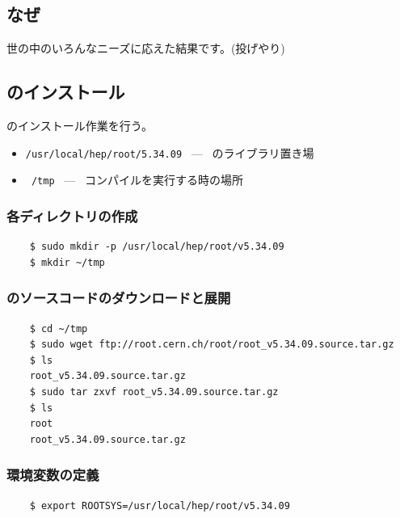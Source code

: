 \documentclass{jarticle}
\begin{document}
  \subsection{なぜ\ROOT }
  世の中のいろんなニーズに応えた結果です。(投げやり)


  \subsection{\ROOT のインストール}
  \ROOT のインストール作業を行う。
  \begin{itemize}
   \item \texttt{/usr/local/hep/root/5.34.09} \ --- \ \ROOT のライブラリ置き場
   \item \texttt{~/tmp} \ --- \ コンパイルを実行する時の場所
  \end{itemize}


   \subsubsection*{各ディレクトリの作成}
\begin{verbatim}
	$ sudo mkdir -p /usr/local/hep/root/v5.34.09
	$ mkdir ~/tmp
\end{verbatim}


   \subsubsection*{\ROOT のソースコードのダウンロードと展開}
\begin{verbatim}
	$ cd ~/tmp
	$ sudo wget ftp://root.cern.ch/root/root_v5.34.09.source.tar.gz
	$ ls
	root_v5.34.09.source.tar.gz
	$ sudo tar zxvf root_v5.34.09.source.tar.gz
	$ ls
	root
	root_v5.34.09.source.tar.gz
\end{verbatim}


   \subsubsection*{環境変数の定義}
\begin{verbatim}
	$ export ROOTSYS=/usr/local/hep/root/v5.34.09
\end{verbatim}
\end{document}
